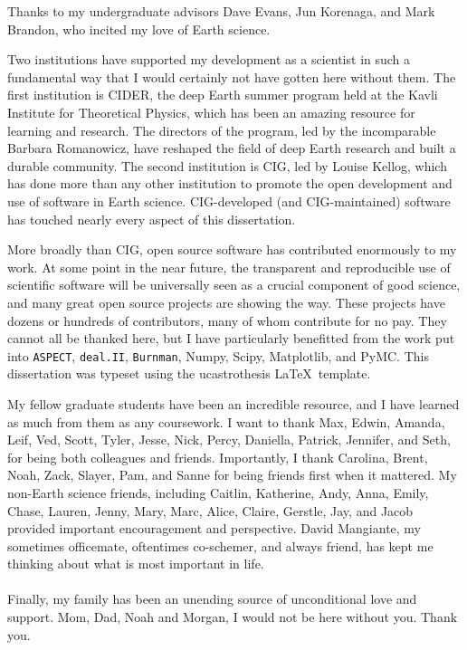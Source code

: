 \documentclass[12pt]{myucthesis}
\begin{document}
\begin{frontmatter}
\begin{acknowledgements}
Thanks to my undergraduate advisors Dave Evans, Jun Korenaga, and Mark Brandon, who
incited my love of Earth science.

Two institutions have supported my development as a scientist in such a fundamental
way that I would certainly not have gotten here without them.
The first institution is CIDER, the deep Earth summer program held 
at the Kavli Institute for Theoretical Physics, 
which has been an amazing resource for learning and research.
The directors of the program, led by the incomparable Barbara Romanowicz,
have reshaped the field of deep Earth research and built a durable community.
The second institution is CIG, led by Louise Kellog, which has done more than any other institution
to promote the open development and use of software in Earth science.
CIG-developed (and CIG-maintained) software has touched nearly every aspect of this dissertation.

More broadly than CIG, open source software has contributed enormously to my work.
At some point in the near future, the transparent and reproducible use of scientific
software will be universally seen as a crucial component of good science, and many great
open source projects are showing the way. These projects have dozens or hundreds of
contributors, many of whom contribute for no pay.
They cannot all be thanked here, but I have particularly benefitted from
the work put into \texttt{ASPECT}, \texttt{deal.II}, \texttt{Burnman},
Numpy, Scipy, Matplotlib, and PyMC.
This dissertation was typeset using the ucastrothesis \LaTeX\ template.

My fellow graduate students have been an incredible resource, and I
have learned as much from them as any coursework. I want to thank
Max, Edwin, Amanda, Leif, Ved, Scott, Tyler, Jesse, Nick, Percy, Daniella, Patrick, Jennifer, and Seth,
for being both colleagues and friends.
Importantly, I thank Carolina, Brent, Noah, Zack, Slayer, Pam, and Sanne for being friends first when it mattered.
My non-Earth science friends, including 
Caitlin, Katherine, Andy, Anna, Emily, Chase, Lauren, Jenny, Mary, Marc, Alice, Claire, Gerstle, Jay, and Jacob
provided important encouragement and perspective.
David Mangiante, my sometimes officemate, oftentimes co-schemer, and always friend, has kept me thinking about what is most important in life.
\\
\\
Finally, my family has been an unending source of unconditional love and support. 
Mom, Dad, Noah and Morgan, I would not be here without you. Thank you.

\end{acknowledgements}
\end{frontmatter}








\end{document}
